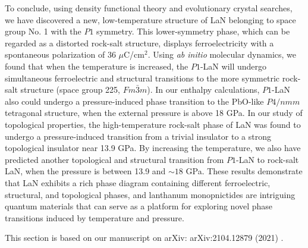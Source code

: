 	To conclude, using density functional theory and evolutionary crystal searches, we have discovered a new, low-temperature structure of LaN belonging to space group No. 1 with the $P1$ symmetry. This lower-symmetry phase, which can be regarded as a distorted rock-salt structure, displays ferroelectricity with a spontaneous polarization of 36 $\mu$C/cm$^2$. Using {\it ab initio} molecular dynamics, we found that when the temperature is increased, the $P1$-LaN will undergo simultaneous ferroelectric and structural transitions to the more symmetric rock-salt structure (space group 225, $Fm\bar{3}m$). In our enthalpy calculations, $P1$-LaN also could undergo a pressure-induced phase transition to the PbO-like $P4/nmm$ tetragonal structure, when the external pressure is above 18 GPa. In our study of topological properties, the high-temperature rock-salt phase of LaN was found to undergo a pressure-induced transition from a trivial insulator to a strong topological insulator near 13.9 GPa. By increasing the temperature, we also have predicted another topological and structural transition from $P1$-LaN to rock-salt LaN, when the pressure is between 13.9 and $\sim 18$ GPa. These results demonstrate that LaN exhibits a rich phase diagram containing different ferroelectric, structural, and topological phases, and lanthanum monopnictides are intriguing quantum materials that can serve as a platform for exploring novel phase transitions induced by temperature and pressure.

    \vspace{12pt}

    \noindent This section is based on our manuscript on arXiv: arXiv:2104.12879 (2021) \cite{chen2021lan}.






	\pagebreak





    

	

    \addtocounter{numch}{1}
	
